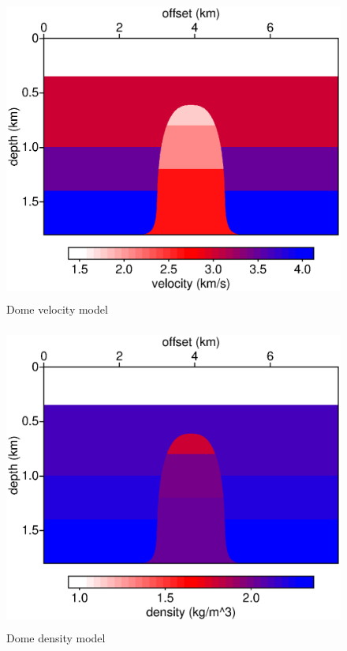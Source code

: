 
\begin{figure}
\includegraphics[height=10cm,width=15cm]{./Fig/fig1.ps}
\caption{Dome velocity model}
\label{fig:vp}
\end{figure}

\begin{figure}
\includegraphics[height=10cm,width=15cm]{./Fig/fig2.ps}
\caption{Dome density model}
\label{fig:dn}
\end{figure}

